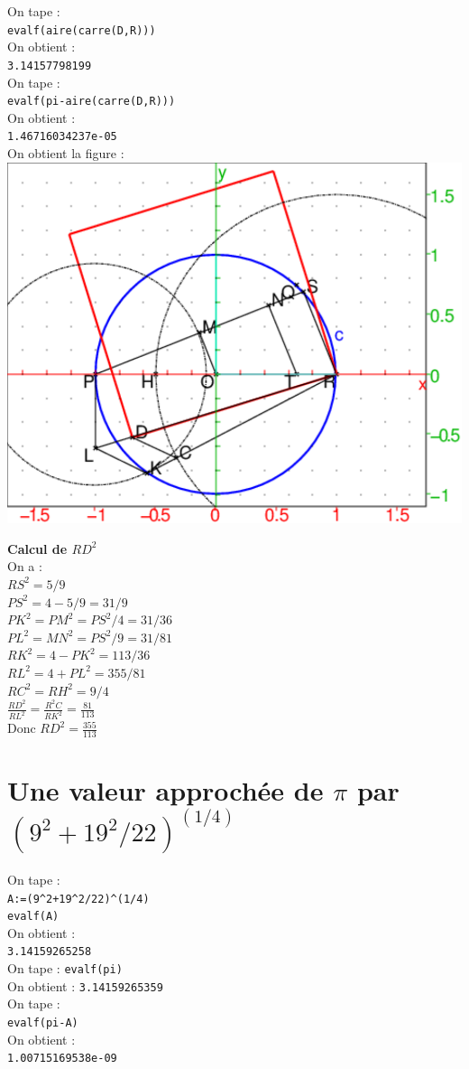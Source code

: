 \documentclass[a4paper,11pt]{book}
\begin{document}
On tape :\\
{\tt evalf(aire(carre(D,R)))}\\
On obtient :\\
{\tt 3.14157798199}\\
On tape :\\
{\tt evalf(pi-aire(carre(D,R)))}\\
On obtient :\\
{\tt 1.46716034237e-05}\\

On obtient la figure :\\
\includegraphics[width=\textwidth]{picarre2}

{\bf Calcul de $RD^2$}\\
On a :\\
$RS^2=5/9$\\
$PS^2=4-5/9=31/9$\\
$PK^2=PM^2=PS^2/4=31/36$\\
$PL^2=MN^2=PS^2/9=31/81$\\
$RK^2=4-PK^2=113/36$\\
$RL^2=4+PL^2=355/81$\\
$RC^2=RH^2=9/4$\\
$\frac{RD^2}{RL^2}=\frac{R^2C}{RK^2}=\frac{81}{113}$\\
Donc $RD^2=\frac{355}{113}$

\section{Une valeur approch\'ee de $\pi$ par $(9^2+19^2/22)^(1/4)$}
\noindent On tape :\\
{\tt A:=(9\verb|^|2+19\verb|^|2/22)\verb|^|(1/4)}\\
{\tt evalf(A)}\\
On obtient :\\
{\tt 3.14159265258}\\
On tape :
{\tt evalf(pi)}\\
On obtient :
{\tt 3.14159265359}\\
On tape :\\
{\tt evalf(pi-A)}\\
On obtient :\\
{\tt 1.00715169538e-09}
\end{document}
